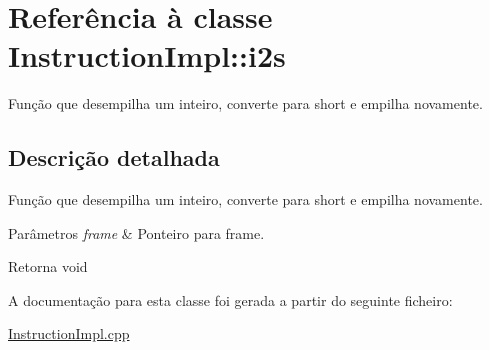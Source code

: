 \hypertarget{class_instruction_impl_1_1i2s}{}\section{Referência à classe Instruction\+Impl\+:\+:i2s}
\label{class_instruction_impl_1_1i2s}


Função que desempilha um inteiro, converte para short e empilha novamente.  




\subsection{Descrição detalhada}
Função que desempilha um inteiro, converte para short e empilha novamente. 


\begin{DoxyParams}{Parâmetros}
{\em frame} & Ponteiro para frame. \\
\hline
\end{DoxyParams}
\begin{DoxyReturn}{Retorna}
void 
\end{DoxyReturn}


A documentação para esta classe foi gerada a partir do seguinte ficheiro\+:\begin{DoxyCompactItemize}
\item 
\hyperlink{_instruction_impl_8cpp}{Instruction\+Impl.\+cpp}\end{DoxyCompactItemize}
